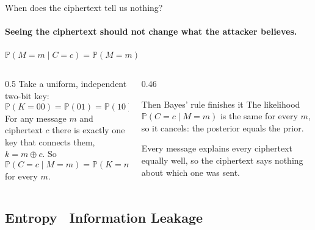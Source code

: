 \documentclass[11pt,aspectratio=169]{beamer}
\newcommand{\Prob}[1]{\mathbb{P}\!\left(#1\right)}
\newcommand{\msg}{M}
\newcommand{\key}{K}
\newcommand{\ctxt}{C}
\newcommand{\xor}{\oplus}
\newcommand{\keyeq}[1]{\begin{center}\large\color{deep}$\displaystyle #1$\end{center}}
\begin{document}
\begin{frame}{When does the ciphertext tell us nothing?}
  \framesubtitle{Seeing the ciphertext should not change what the attacker believes.}
  \keyeq{\Prob{\msg=m\mid\ctxt=c}=\Prob{\msg=m}}
  \begin{columns}[T]
    \begin{column}{0.5\textwidth}
      Take a uniform, independent two-bit key:
      \[\Prob{\key=00}=\Prob{01}=\Prob{10}=\Prob{11}=\tfrac14.\]
      For any message $m$ and ciphertext $c$ there is exactly one key
      that connects them, $k=m\xor c$. So
      \[\Prob{\ctxt=c\mid\msg=m}=\Prob{\key=m\xor c}=\tfrac14\]
      for every $m$.
    \end{column}
    \begin{column}{0.46\textwidth}
      \begin{block}{Then Bayes' rule finishes it}
        The likelihood $\Prob{\ctxt=c\mid\msg=m}$ is the same for every
        $m$, so it cancels: the posterior equals the prior.
      \end{block}
      \smallskip
      Every message explains every ciphertext equally well, so the
      ciphertext says nothing about which one was sent.
    \end{column}
  \end{columns}
\end{frame}

\subsection{Entropy \textperiodcentered\ Information Leakage}
\end{document}
